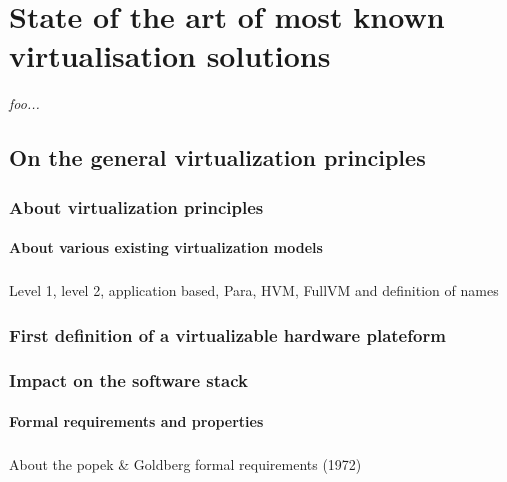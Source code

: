 
\chapter{State of the art of most known virtualisation solutions}

{\it
foo...
}

\doMinitoc

\section{On the general virtualization principles}

\subsection{About virtualization principles}

\subsubsection{About various existing virtualization models}

\paragraph{}
Level 1, level 2, application based, Para, HVM, FullVM and definition of names

\subsection{First definition of a virtualizable hardware plateform}

\subsection{Impact on the software stack}

\subsubsection{Formal requirements and properties}

\paragraph{}
About the popek \& Goldberg formal requirements (1972)


